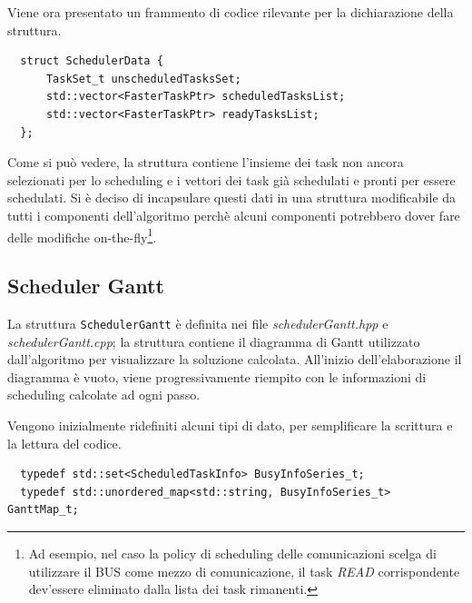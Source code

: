 Viene ora presentato un frammento di codice rilevante per la dichiarazione 
della struttura.
\newline
\begin{verbatim}
  struct SchedulerData {
      TaskSet_t unscheduledTasksSet;
      std::vector<FasterTaskPtr> scheduledTasksList;
      std::vector<FasterTaskPtr> readyTasksList;
  };
\end{verbatim}
Come si può vedere, la struttura contiene l'insieme dei task non ancora 
selezionati per lo scheduling e i vettori dei task già schedulati e pronti per 
essere schedulati. Si è deciso di incapsulare questi dati in una struttura 
modificabile da tutti i componenti dell'algoritmo perchè alcuni componenti 
potrebbero dover fare delle modifiche on-the-fly\footnote{Ad esempio, nel caso 
la policy di scheduling delle comunicazioni scelga di utilizzare il BUS come 
mezzo di comunicazione, il task \emph{READ} corrispondente dev'essere 
eliminato dalla lista dei task rimanenti.}.

\subsection{Scheduler Gantt}
La struttura \verb+SchedulerGantt+ è definita nei file 
\emph{schedulerGantt.hpp} e \emph{schedulerGantt.cpp}; la struttura contiene il 
diagramma di Gantt utilizzato dall'algoritmo per visualizzare la soluzione 
calcolata. All'inizio dell'elaborazione il diagramma è vuoto, viene 
progressivamente riempito con le informazioni di scheduling calcolate ad ogni 
passo.

Vengono inizialmente ridefiniti alcuni tipi di dato, per semplificare la 
scrittura e la lettura del codice.
\begin{verbatim}
  typedef std::set<ScheduledTaskInfo> BusyInfoSeries_t;
  typedef std::unordered_map<std::string, BusyInfoSeries_t> GanttMap_t;
\end{verbatim}

